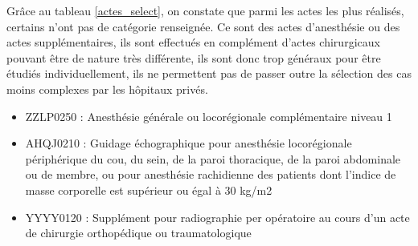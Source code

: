 Grâce au tableau \ref{actes_select}, on constate que parmi les actes les plus réalisés, certains n'ont pas de catégorie renseignée. Ce sont des actes d'anesthésie ou des actes supplémentaires, ils sont effectués en complément d'actes chirurgicaux pouvant être de nature très différente, ils sont donc trop généraux pour être étudiés individuellement, ils ne permettent pas de passer outre la sélection des cas moins complexes par les hôpitaux privés.

\begin{itemize}
    \item ZZLP0250 : Anesthésie générale ou locorégionale complémentaire niveau 1

    \item AHQJ0210 : Guidage échographique pour anesthésie locorégionale périphérique du cou, du sein, de la paroi thoracique, de la paroi abdominale ou de membre, ou pour anesthésie rachidienne des patients dont l'indice de masse corporelle est supérieur ou égal à 30 kg/m2

    \item YYYY0120 : Supplément pour radiographie per opératoire au cours d'un acte de chirurgie orthopédique ou traumatologique
    
\end{itemize}

\bigskip


